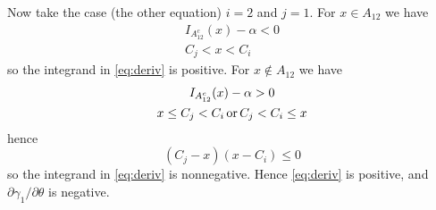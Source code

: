 \documentclass[11pt]{article}
\newcommand{\opor}{\mathop{\rm or}}
\begin{document}
Now take the case (the other equation) $i = 2$ and $j = 1$.
For $x \in A_{1 2}$ we have
\begin{gather*}
   I_{A_{1 2}^c}(x) - \alpha < 0
   \\
   C_j < x < C_i
\end{gather*}
so the integrand in \eqref{eq:deriv} is positive.
For $x \notin A_{1 2}$ we have
\begin{gather*}
   I_{A_{1 2}^c}(x) - \alpha > 0
   \\
   x \le C_j < C_i \opor C_j < C_i \le x
\end{gather*}
hence
$$
   (C_j - x) (x - C_i)  \le 0
$$
so the integrand in \eqref{eq:deriv} is nonnegative.
Hence \eqref{eq:deriv} is positive,
and $\partial \gamma_1 / \partial \theta$ is negative.
\end{document}
